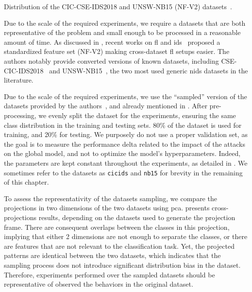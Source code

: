 \begin{table}
  \centering
  \caption{
    Distribution of the CIC-CSE-IDS2018 and UNSW-NB15 (NF-V2) datasets~\cite{sarhan_StandardFeatureSet_2022,layeghy_GeneralisabilityMachineLearningbased_2022}.
    \label{tbl:dataset.cicids}
  }
  
\end{table}



Due to the scale of the required experiments, we require a datasets that are both representative of the problem and small enough to be processed in a reasonable amount of time.
As discussed in , recent works on \gls{fl} and \gls{ids}~\cite{sarhan_StandardFeatureSet_2021} proposed a standardized feature set (NF-V2) making cross-dataset \gls{fl} setups easier.
The authors notably provide converted versions of known datasets, including CSE-CIC-IDS2018~\cite{sharafaldin_GeneratingNewIntrusion_2018} and UNSW-NB15~\cite{moustafa_UNSWNB15comprehensivedata_2015}, the two most used generic \gls{nids} datasets in the literature.

Due to the scale of the required experiments, we use the ``sampled'' version of the datasets provided by the authors~\cite{layeghy_GeneralisabilityMachineLearningbased_2022}, and already mentioned in .
After pre-processing, we evenly split the dataset for the experiments, ensuring the same class distribution in the training and testing sets.
80\% of the dataset is used for training, and 20\% for testing.
We purposely do not use a proper validation set, as the goal is to measure the performance delta related to the impact of the attacks on the global model, and not to optimize the model's hyperparameters.
Indeed, the parameters are kept constant throughout the experiments, as detailed in .
We sometimes refer to the datasets as \texttt{cicids} and \texttt{nb15} for brevity in the remaining of this chapter.

To assess the representativity of the datasets sampling, we compare the projections in two dimensions of the two datasets using \gls{pca}.
 presents cross-projections results, depending on the datasets used to generate the projection frame.
There are consequent overlaps between the classes in this projection, implying that either 2 dimensions are not enough to separate the classes, or there are features that are not relevant to the classification task.
Yet, the projected patterns are identical between the two datasets, which indicates that the sampling process does not introduce significant distribution bias in the dataset.
Therefore, experiments performed over the sampled datasets should be representative of observed the behaviors in the original dataset.


